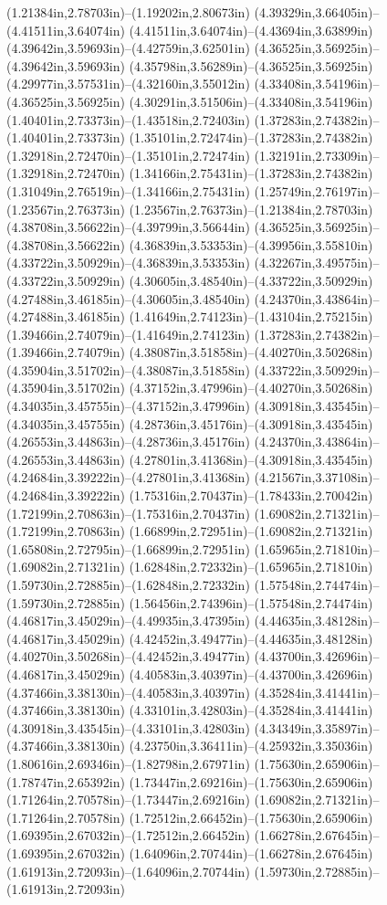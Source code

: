 (1.21384in,2.78703in)--(1.19202in,2.80673in) (4.39329in,3.66405in)--(4.41511in,3.64074in) (4.41511in,3.64074in)--(4.43694in,3.63899in) (4.39642in,3.59693in)--(4.42759in,3.62501in) (4.36525in,3.56925in)--(4.39642in,3.59693in) (4.35798in,3.56289in)--(4.36525in,3.56925in) (4.29977in,3.57531in)--(4.32160in,3.55012in) (4.33408in,3.54196in)--(4.36525in,3.56925in) (4.30291in,3.51506in)--(4.33408in,3.54196in) (1.40401in,2.73373in)--(1.43518in,2.72403in) (1.37283in,2.74382in)--(1.40401in,2.73373in) (1.35101in,2.72474in)--(1.37283in,2.74382in) (1.32918in,2.72470in)--(1.35101in,2.72474in) (1.32191in,2.73309in)--(1.32918in,2.72470in) (1.34166in,2.75431in)--(1.37283in,2.74382in) (1.31049in,2.76519in)--(1.34166in,2.75431in) (1.25749in,2.76197in)--(1.23567in,2.76373in) (1.23567in,2.76373in)--(1.21384in,2.78703in) (4.38708in,3.56622in)--(4.39799in,3.56644in) (4.36525in,3.56925in)--(4.38708in,3.56622in) (4.36839in,3.53353in)--(4.39956in,3.55810in) (4.33722in,3.50929in)--(4.36839in,3.53353in) (4.32267in,3.49575in)--(4.33722in,3.50929in) (4.30605in,3.48540in)--(4.33722in,3.50929in) (4.27488in,3.46185in)--(4.30605in,3.48540in) (4.24370in,3.43864in)--(4.27488in,3.46185in) (1.41649in,2.74123in)--(1.43104in,2.75215in) (1.39466in,2.74079in)--(1.41649in,2.74123in) (1.37283in,2.74382in)--(1.39466in,2.74079in) (4.38087in,3.51858in)--(4.40270in,3.50268in) (4.35904in,3.51702in)--(4.38087in,3.51858in) (4.33722in,3.50929in)--(4.35904in,3.51702in) (4.37152in,3.47996in)--(4.40270in,3.50268in) (4.34035in,3.45755in)--(4.37152in,3.47996in) (4.30918in,3.43545in)--(4.34035in,3.45755in) (4.28736in,3.45176in)--(4.30918in,3.43545in) (4.26553in,3.44863in)--(4.28736in,3.45176in) (4.24370in,3.43864in)--(4.26553in,3.44863in) (4.27801in,3.41368in)--(4.30918in,3.43545in) (4.24684in,3.39222in)--(4.27801in,3.41368in) (4.21567in,3.37108in)--(4.24684in,3.39222in) (1.75316in,2.70437in)--(1.78433in,2.70042in) (1.72199in,2.70863in)--(1.75316in,2.70437in) (1.69082in,2.71321in)--(1.72199in,2.70863in) (1.66899in,2.72951in)--(1.69082in,2.71321in) (1.65808in,2.72795in)--(1.66899in,2.72951in) (1.65965in,2.71810in)--(1.69082in,2.71321in) (1.62848in,2.72332in)--(1.65965in,2.71810in) (1.59730in,2.72885in)--(1.62848in,2.72332in) (1.57548in,2.74474in)--(1.59730in,2.72885in) (1.56456in,2.74396in)--(1.57548in,2.74474in) (4.46817in,3.45029in)--(4.49935in,3.47395in) (4.44635in,3.48128in)--(4.46817in,3.45029in) (4.42452in,3.49477in)--(4.44635in,3.48128in) (4.40270in,3.50268in)--(4.42452in,3.49477in) (4.43700in,3.42696in)--(4.46817in,3.45029in) (4.40583in,3.40397in)--(4.43700in,3.42696in) (4.37466in,3.38130in)--(4.40583in,3.40397in) (4.35284in,3.41441in)--(4.37466in,3.38130in) (4.33101in,3.42803in)--(4.35284in,3.41441in) (4.30918in,3.43545in)--(4.33101in,3.42803in) (4.34349in,3.35897in)--(4.37466in,3.38130in) (4.23750in,3.36411in)--(4.25932in,3.35036in) (1.80616in,2.69346in)--(1.82798in,2.67971in) (1.75630in,2.65906in)--(1.78747in,2.65392in) (1.73447in,2.69216in)--(1.75630in,2.65906in) (1.71264in,2.70578in)--(1.73447in,2.69216in) (1.69082in,2.71321in)--(1.71264in,2.70578in) (1.72512in,2.66452in)--(1.75630in,2.65906in) (1.69395in,2.67032in)--(1.72512in,2.66452in) (1.66278in,2.67645in)--(1.69395in,2.67032in) (1.64096in,2.70744in)--(1.66278in,2.67645in) (1.61913in,2.72093in)--(1.64096in,2.70744in) (1.59730in,2.72885in)--(1.61913in,2.72093in) 